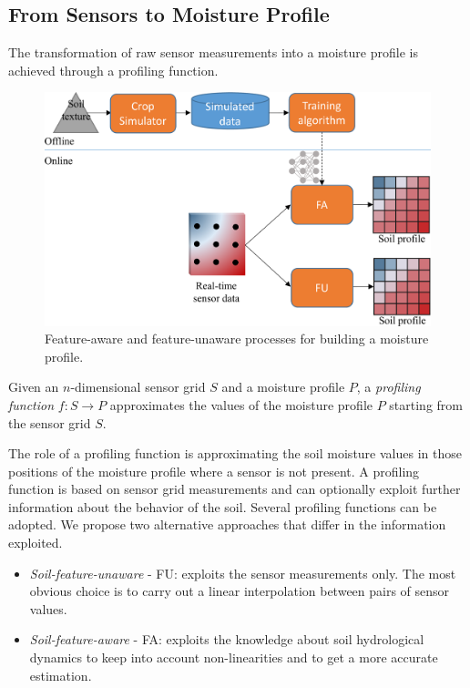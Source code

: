 \subsection{From Sensors to Moisture Profile}
\label{pluto-sec:FromSensorsToMoistureProfile}
The transformation of raw sensor measurements into a moisture profile is achieved through a profiling function. 
\begin{figure}[t]
\centering
\includegraphics[scale=.2]{chapters/physics-aware/pluto/img/process.pdf}
\caption{Feature-aware and feature-unaware processes for building a moisture profile.}
\label{pluto-fig:process}
\end{figure}
\begin{definition}
Given an $n$-dimensional sensor grid $S$ and a moisture profile $P$, a \emph{profiling function} $f : S \rightarrow P$ approximates the values of the moisture profile $P$ starting from the sensor grid $S$.
\end{definition}

The role of a profiling function is approximating the soil moisture values in those positions of the moisture profile where a sensor is not present. 
A profiling function is based on sensor grid measurements and can optionally exploit further information about the behavior of the soil. 
Several profiling functions can be adopted. 
We propose two alternative approaches that differ in the information exploited.
\begin{itemize}
    \item \emph{Soil-feature-unaware} - FU: exploits the sensor measurements only. The most obvious choice is to carry out a linear interpolation between pairs of sensor values.
    \item \emph{Soil-feature-aware} - FA: exploits the knowledge about soil hydrological dynamics to keep into account non-linearities and to get a more accurate estimation.
\end{itemize}

